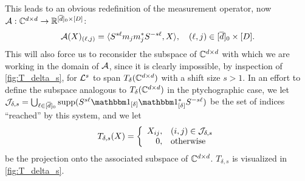 This leads to an obvious redefinition of the measurement operator, now $\mathcal{A} : \mathbb{C}^{d \times d} \to \mathbb{R}^{[\overline{d}]_0 \times [D]}$: \begin{equation} \mathcal{A}(X)_{(\ell, j)} = \langle S^{s \ell} m_j m_j^* S^{-s \ell}, X\rangle, \quad (\ell, j) \in [\overline{d}]_0 \times [D]. \label{eq:pty_meas_op} \end{equation}  This will also force us to reconsider the subspace of $\mathbb{C}^{d \times d}$ with which we are working in the domain of $\mathcal{A}$, since it is clearly impossible, by inspection of \cref{fig:T_delta_s}, for $\mathcal{L}^s$ to span $T_\delta(\mathbb{C}^{d \times d})$ with a shift size $s > 1$.  In an effort to define the subspace analogous to $T_\delta(\mathbb{C}^{d \times d})$ in the ptychographic case, we let $\Jc_{\delta, s} = \bigcup_{\ell \in [\dbar]_0}\supp(S^{s \ell} \one_{[\delta]} \one_{[\delta]}^* S^{-s \ell})$ be the set of indices ``reached'' by this system, and we let \begin{equation} T_{\delta, s}(X) = \left\{\begin{array}{r@{,\quad}l} X_{ij} & (i, j) \in \Jc_{\delta, s} \\ 0 & \text{otherwise}\end{array}\right.\label{eq:T_delta_s}\end{equation} be the projection onto the associated subspace of $\mathbb{C}^{d \times d}$.  $T_{\delta, s}$ is visualized in \cref{fig:T_delta_s}.
